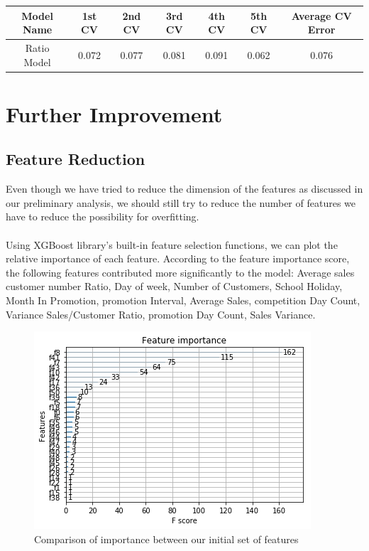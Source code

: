 \documentclass{article}
\begin{document}
\begin{center}
 \begin{tabular}{||c c c c c c c||} 
 \hline
 Model Name & 1st CV & 2nd CV & 3rd CV & 4th CV & 5th CV & Average CV Error \\ [0.5ex] 
 \hline\hline
 Ratio Model & 0.072 & 0.077 & 0.081 & 0.091 & 0.062 & 0.076 \\[1ex] 
 \hline
\end{tabular}
\end{center}


\section{Further Improvement}
\subsection{Feature Reduction}
Even though we have tried to reduce the dimension of the features as discussed in our preliminary analysis, we should still try to reduce the number of features we have to reduce the possibility for overfitting. \\
 \\
Using XGBoost library’s built-in feature selection functions, we can plot the relative importance of each feature. According to the feature importance score, the following features contributed more significantly to the model: Average sales customer number Ratio, Day of week, Number of Customers, School Holiday, Month In Promotion, promotion Interval, Average Sales, competition Day Count, Variance Sales/Customer Ratio, promotion Day Count, Sales Variance. 

\begin{figure}[h]
	\centering
	\includegraphics[scale=0.5]{comparison_between_features.png}
	\caption{Comparison of importance between our initial set of features}
\end{figure}
\end{document}
